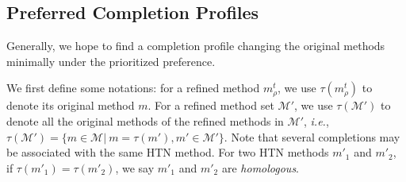 \documentclass[letterpaper]{article} %
\newtheorem{definition}{Definition}
\newcommand{\HtnDomain}{\mathfrak{D}}
\newcommand{\Methods}{\mathcal{M}}
\newcommand{\tn}{\mathsf{tn}}
\newcommand{\improveFunction}{\rho}
\newcommand{\stratify}{k}
\newcommand{\complete}{\tau}
\newcommand{\inverseComplete}{\complete}
\newcommand{\insertTasksof}{T^\mathtt{add}}
\begin{document}
%
%
%

\subsection{Preferred Completion Profiles}
Generally, we hope to find a completion profile changing the original methods minimally under the prioritized preference.

We first define some notations:
for a refined method $m^t_\improveFunction$, we use $\inverseComplete(m^t_\improveFunction)$ to denote its original method $m$. %
For a refined method set $\Methods'$, we use $\inverseComplete(\Methods')$ to denote all the original methods of the refined methods in $\Methods'$, \emph{i.e.}, $\inverseComplete(\Methods')\!=\!\{m \!\in\! \Methods | \ m \!=\! \inverseComplete(m'), m' \in \Methods'\}$.
Note that several completions may be associated with the same HTN method.
For two HTN methods $m'_1$ and $m'_2$, if $\inverseComplete(m'_1) = \inverseComplete(m'_2)$, we say $m'_1$ and $m'_2$ are \emph{homologous}.

\end{document}
